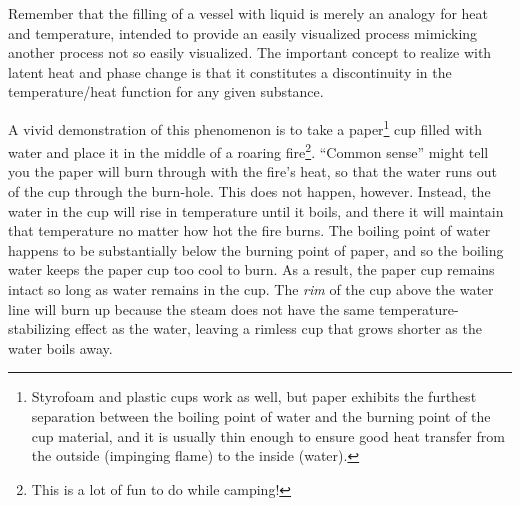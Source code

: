 Remember that the filling of a vessel with liquid is merely an analogy for heat and temperature, intended to provide an easily visualized process mimicking another process not so easily visualized.  The important concept to realize with latent heat and phase change is that it constitutes a discontinuity in the temperature/heat function for any given substance.

A vivid demonstration of this phenomenon is to take a paper\footnote{Styrofoam and plastic cups work as well, but paper exhibits the furthest separation between the boiling point of water and the burning point of the cup material, and it is usually thin enough to ensure good heat transfer from the outside (impinging flame) to the inside (water).} cup filled with water and place it in the middle of a roaring fire\footnote{This is a lot of fun to do while camping!}.  ``Common sense'' might tell you the paper will burn through with the fire's heat, so that the water runs out of the cup through the burn-hole.  This does not happen, however.  Instead, the water in the cup will rise in temperature until it boils, and there it will maintain that temperature no matter how hot the fire burns.  The boiling point of water happens to be substantially below the burning point of paper, and so the boiling water keeps the paper cup too cool to burn.  As a result, the paper cup remains intact so long as water remains in the cup.  The \textit{rim} of the cup above the water line will burn up because the steam does not have the same temperature-stabilizing effect as the water, leaving a rimless cup that grows shorter as the water boils away.

\vskip 10pt


